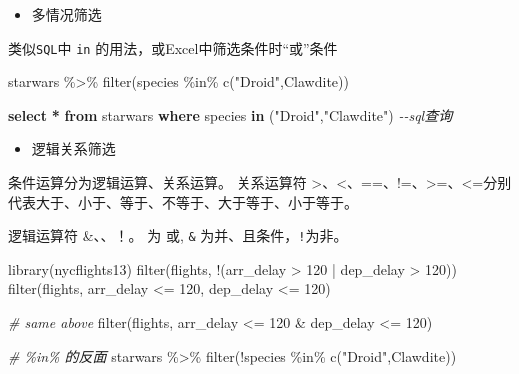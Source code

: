 \documentclass[
]{book}
\newenvironment{Shaded}{\begin{snugshade}}{\end{snugshade}}
\newcommand{\CommentTok}[1]{\textcolor[rgb]{0.56,0.35,0.01}{\textit{#1}}}
\newcommand{\DecValTok}[1]{\textcolor[rgb]{0.00,0.00,0.81}{#1}}
\newcommand{\FunctionTok}[1]{\textcolor[rgb]{0.00,0.00,0.00}{#1}}
\newcommand{\KeywordTok}[1]{\textcolor[rgb]{0.13,0.29,0.53}{\textbf{#1}}}
\newcommand{\NormalTok}[1]{#1}
\newcommand{\OperatorTok}[1]{\textcolor[rgb]{0.81,0.36,0.00}{\textbf{#1}}}
\newcommand{\OtherTok}[1]{\textcolor[rgb]{0.56,0.35,0.01}{#1}}
\newcommand{\SpecialCharTok}[1]{\textcolor[rgb]{0.00,0.00,0.00}{#1}}
\newcommand{\StringTok}[1]{\textcolor[rgb]{0.31,0.60,0.02}{#1}}
\providecommand{\tightlist}{%
  \setlength{\itemsep}{0pt}\setlength{\parskip}{0pt}}
\begin{document}
\begin{itemize}
\tightlist
\item
  多情况筛选
\end{itemize}

类似\texttt{SQL}中 \texttt{in} 的用法，或Excel中筛选条件时``或''条件

\begin{Shaded}
\begin{Highlighting}[]
\NormalTok{starwars }\SpecialCharTok{\%\textgreater{}\%} 
  \FunctionTok{filter}\NormalTok{(species }\SpecialCharTok{\%in\%}  \FunctionTok{c}\NormalTok{(}\StringTok{"Droid"}\NormalTok{,}\StringTok{\textquotesingle{}Clawdite\textquotesingle{}}\NormalTok{))}
\end{Highlighting}
\end{Shaded}

\begin{Shaded}
\begin{Highlighting}[]
\KeywordTok{select} \OperatorTok{*} \KeywordTok{from}\NormalTok{ starwars }\KeywordTok{where}\NormalTok{ species }\KeywordTok{in}\NormalTok{ (}\OtherTok{"Droid"}\NormalTok{,}\OtherTok{"Clawdite"}\NormalTok{) }\CommentTok{{-}{-}sql查询}
\end{Highlighting}
\end{Shaded}

\begin{itemize}
\tightlist
\item
  逻辑关系筛选
\end{itemize}

条件运算分为逻辑运算、关系运算。
关系运算符 \textgreater、\textless、==、!=、\textgreater=、\textless=分别代表大于、小于、等于、不等于、大于等于、小于等于。

逻辑运算符 \&、\textbar、！。 \texttt{\textbar{}}为 或, \texttt{\&} 为并、且条件，\texttt{!}为非。

\begin{Shaded}
\begin{Highlighting}[]
\FunctionTok{library}\NormalTok{(nycflights13)}
\FunctionTok{filter}\NormalTok{(flights, }\SpecialCharTok{!}\NormalTok{(arr\_delay }\SpecialCharTok{\textgreater{}} \DecValTok{120} \SpecialCharTok{|}\NormalTok{ dep\_delay }\SpecialCharTok{\textgreater{}} \DecValTok{120}\NormalTok{))}
\FunctionTok{filter}\NormalTok{(flights, arr\_delay }\SpecialCharTok{\textless{}=} \DecValTok{120}\NormalTok{, dep\_delay }\SpecialCharTok{\textless{}=} \DecValTok{120}\NormalTok{)}

\CommentTok{\# same above}
\FunctionTok{filter}\NormalTok{(flights, arr\_delay }\SpecialCharTok{\textless{}=} \DecValTok{120} \SpecialCharTok{\&}\NormalTok{ dep\_delay }\SpecialCharTok{\textless{}=} \DecValTok{120}\NormalTok{)}

\CommentTok{\# \%in\% 的反面}
\NormalTok{starwars }\SpecialCharTok{\%\textgreater{}\%} 
  \FunctionTok{filter}\NormalTok{(}\SpecialCharTok{!}\NormalTok{species }\SpecialCharTok{\%in\%}  \FunctionTok{c}\NormalTok{(}\StringTok{"Droid"}\NormalTok{,}\StringTok{\textquotesingle{}Clawdite\textquotesingle{}}\NormalTok{))}
\end{Highlighting}
\end{Shaded}
\end{document}
